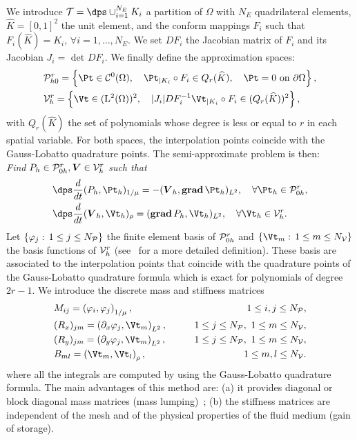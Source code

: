 \documentclass[a4paper]{article}
\def\grad{\mathop{\boldsymbol{\mathrm{grad}}}\nolimits}
\def\bV{\boldsymbol{V}}
\def\L{\mathrm{L}}
\def\cC{\mathcal{C}}
\begin{document}
We introduce ${\cal T}= \dps \cup_{i=1}^{N_E} K_i$ a partition of
$\Omega$ with $N_E$ 
quadrilateral elements, $\widehat{K}=[0,1]^2$ the unit element, and the
conform mappings $F_i$ such that $F_i(\widehat{K})=K_i$, $\forall
i=1,\ldots,N_E$. %
We set $DF_i$  the Jacobian matrix of $F_i$
and its Jacobian $J_i= \mbox{ det } DF_i$. We finally define the 
approximation spaces:
\begin{align*}
& {\cal P}_{h 0}^r=\left\{ \Pt\in \cC^0(\Omega), \quad 
\Pt_{|K_i} \circ F_i \in Q_r(\widehat{K}), \quad 
\Pt=0  \mbox{  on } \partial \Omega \right\},\\
& {\cal V}_h^r=\left\{ \Vt\in (\L^2(\Omega))^2, \quad 
|J_i| DF_i^{-1} \Vt_{|K_i} \circ F_i \in  (Q_r(\widehat{K}))^2 \right\},  
\end{align*}
with $Q_r(\widehat{K})$ the set of polynomials whose degree is less or 
equal to $r$ in each spatial variable. %
For both spaces, the 
interpolation points coincide with the Gauss-Lobatto quadrature points. 
The semi-approximate problem is then:\\
{\it Find $P_h \in {\cal P}_{0h}^r, \bV \in {\cal V}_h^r$ such that}
\begin{align*}
&\dps \frac{d}{dt} (P_h,\Pt_h)_{1/\mu}= - ( \bV_h, \grad \Pt_h)_{L^2}, 
\quad \forall \Pt_h \in {\cal P}_{0h}^r,\\
& \dps \frac{d}{dt}(\bV_h, \Vt_h )_{\rho} =(\grad P_h, \Vt_h)_{L^2}, 
\quad \forall \Vt_h \in {\cal V}_h^r.
\end{align*}
Let $\{\varphi_j:\,1\le j\le N_{\cal P}\}$ 
the finite element basis of ${\cal P}_{0h}^r$
   and $\{\Vt_m:\,1\le
m\le N_{\cal V}\}$ the basis functions of ${\cal V}_h^r$ 
(see~\cite{fauqueux,cohen-fauq:00} for a more 
detailed definition). These basis are associated to the interpolation
points that coincide with the quadrature points of the
Gauss-Lobatto quadrature formula which is exact for polynomials of
degree $2r-1$. We introduce the  discrete mass and stiffness
matrices 
\begin{eqnarray*}
&M_{ij}=\left( \varphi_{i},\varphi_{j}\right)_{1/\mu},
&\qquad 1\le i,j\le N_{\cal P},\\
&(R_{x})_{jm}=\left( \partial_{x}\varphi_{j},\Vt_{m}\right)_{L^2},
&\qquad 1\le j\le N_{\cal P},\ 1\le m\le N_{\cal V},\\
&(R_{y})_{jm}=\left( \partial_{y}\varphi_{j},\Vt_{m}\right)_{L^2},
&\qquad 1\le j\le N_{\cal P},\ 1\le m\le N_{\cal V},\\
&B_{ml}=\left( \Vt_{m},\Vt_{l}\right)_{\rho},
&\qquad 1\le m,l\le N_{\cal V}.
\end{eqnarray*}
where all the integrals are computed by using the Gauss-Lobatto
quadrature formula. The main advantages of this method are: %
 (a) it provides diagonal or block diagonal mass matrices (mass
lumping)~; (b) the stiffness matrices are independent of the mesh and
of the physical properties of the fluid medium (gain of storage).
\end{document}
